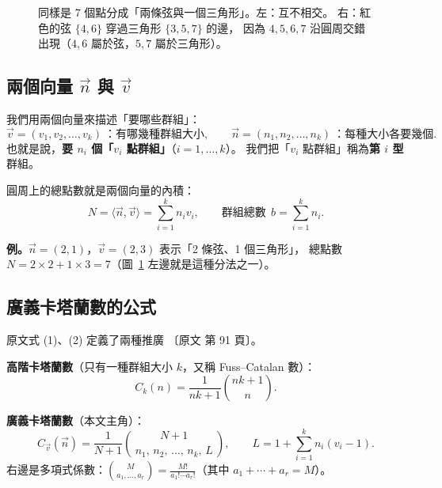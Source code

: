 \documentclass[11pt,a4paper]{article}
\newcommand{\vn}{\vec n}
\newcommand{\vv}{\vec v}
\newcommand{\ip}[2]{\langle #1,#2\rangle}
\newcommand{\Cv}{C_{\vv}}
\newcommand{\paper}[1]{{\small\color{gray!70!black}〔原文 #1〕}}
\newcommand{\CirclePts}[2]{%
  \draw[gray!65,line width=0.6pt] (0,0) circle (#2);
  \foreach \i in {1,...,#1}{\coordinate (p\i) at ({90-360/#1*(\i-1)}:#2);}
}
\newcommand{\CircleDots}[1]{\foreach \i in {1,...,#1}{\fill[black] (p\i) circle (1.6pt);}}
\newcommand{\CircleLabels}[2]{\foreach \i in {1,...,#1}{\node[font=\scriptsize] at ({90-360/#1*(\i-1)}:#2) {\i};}}
\begin{document}
\begin{figure}[H]
\centering
{}
\caption{同樣是 7 個點分成「兩條弦與一個三角形」。左：互不相交。
右：\textcolor{cBad}{紅色的弦} $\{4,6\}$ 穿過三角形 $\{3,5,7\}$ 的邊，
因為 $4,5,6,7$ 沿圓周交錯出現（$4,6$ 屬於弦，$5,7$ 屬於三角形）。}
\label{fig:crossing}
\end{figure}

\subsection{兩個向量 $\vn$ 與 $\vv$}

我們用兩個向量來描述「要哪些群組」：
\[
\vv=(v_1,v_2,\ldots,v_k)\ \text{：有哪幾種群組大小},\qquad
\vn=(n_1,n_2,\ldots,n_k)\ \text{：每種大小各要幾個}.
\]
也就是說，\textbf{要 $n_i$ 個「$v_i$ 點群組」}（$i=1,\ldots,k$）。
我們把「$v_i$ 點群組」稱為\textbf{第 $i$ 型}群組。

圓周上的總點數就是兩個向量的內積：
\[
N=\ip{\vn}{\vv}=\sum_{i=1}^k n_iv_i ,
\qquad\text{群組總數}\ \ b=\sum_{i=1}^k n_i .
\]

\textbf{例。}$\vn=(2,1)$，$\vv=(2,3)$ 表示「2 條弦、1 個三角形」，
總點數 $N=2\times 2+1\times 3=7$（圖~\ref{fig:crossing} 左邊就是這種分法之一）。

\subsection{廣義卡塔蘭數的公式}

原文式 (1)、(2) 定義了兩種推廣 \paper{第 91 頁}。

\textbf{高階卡塔蘭數}（只有一種群組大小 $k$，又稱 Fuss--Catalan 數）：
\[
C_k(n)=\frac{1}{nk+1}\binom{nk+1}{n}.
\]

\textbf{廣義卡塔蘭數}（本文主角）：
\begin{equation}\label{eq:gc}
\Cv(\vn)=\frac{1}{N+1}\binom{N+1}{\,n_1,\,n_2,\,\ldots,\,n_k,\,L\,},
\qquad L=1+\sum_{i=1}^k n_i(v_i-1).
\end{equation}
右邊是多項式係數：$\displaystyle\binom{M}{a_1,\ldots,a_r}=\frac{M!}{a_1!\cdots a_r!}$（其中 $a_1+\cdots+a_r=M$）。
\end{document}
